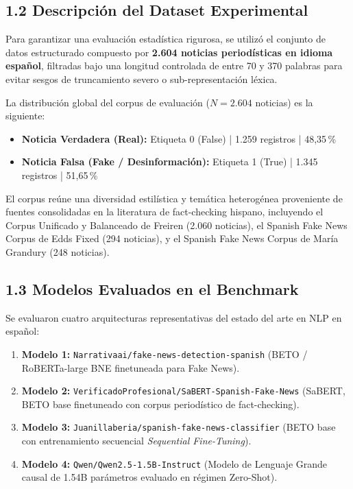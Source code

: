 \subsection*{1.2 Descripción del Dataset Experimental}

Para garantizar una evaluación estadística rigurosa, se utilizó el conjunto de datos estructurado compuesto por \textbf{2.604 noticias periodísticas en idioma español}, filtradas bajo una longitud controlada de entre 70 y 370 palabras para evitar sesgos de truncamiento severo o sub-representación léxica.

La distribución global del corpus de evaluación ($N = 2.604$ noticias) es la siguiente:
\begin{itemize}
    \item \textbf{Noticia Verdadera (Real):} Etiqueta 0 (False) | 1.259 registros | 48,35\,\%
    \item \textbf{Noticia Falsa (Fake / Desinformación):} Etiqueta 1 (True) | 1.345 registros | 51,65\,\%
\end{itemize}

El corpus reúne una diversidad estilística y temática heterogénea proveniente de fuentes consolidadas en la literatura de fact-checking hispano, incluyendo el Corpus Unificado y Balanceado de Freiren (2.060 noticias), el Spanish Fake News Corpus de Edds Fixed (294 noticias), y el Spanish Fake News Corpus de María Grandury (248 noticias).

\subsection*{1.3 Modelos Evaluados en el Benchmark}

Se evaluaron cuatro arquitecturas representativas del estado del arte en NLP en español:
\begin{enumerate}
    \item \textbf{Modelo 1:} \texttt{Narrativaai/fake-news-detection-spanish} (BETO / RoBERTa-large BNE finetuneada para Fake News).
    \item \textbf{Modelo 2:} \texttt{VerificadoProfesional/SaBERT-Spanish-Fake-News} (SaBERT, BETO base finetuneado con corpus periodístico de fact-checking).
    \item \textbf{Modelo 3:} \texttt{Juanillaberia/spanish-fake-news-classifier} (BETO base con entrenamiento secuencial \textit{Sequential Fine-Tuning}).
    \item \textbf{Modelo 4:} \texttt{Qwen/Qwen2.5-1.5B-Instruct} (Modelo de Lenguaje Grande causal de 1.54B parámetros evaluado en régimen Zero-Shot).
\end{enumerate}

